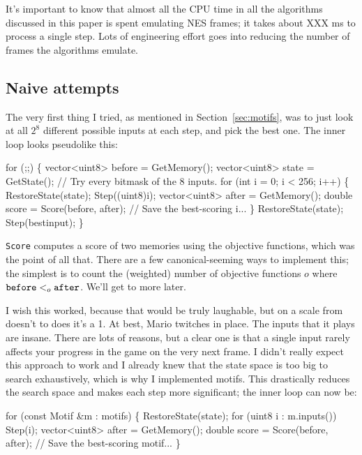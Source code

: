 \documentclass[twocolumn]{article}
\begin{document}
It's important to know that almost all the CPU time in all the
algorithms discussed in this paper is spent emulating NES frames;
it takes about XXX ms to process a single step. Lots of engineering
effort goes into reducing the number of frames the algorithms emulate.

\subsection{Naive attempts}

The very first thing I tried, as mentioned in
Section~\ref{sec:motifs}, was to just look at all $2^8$ different
possible inputs at each step, and pick the best one. The inner
loop looks pseudolike this:

\begin{code}
  for (;;) \{
    vector<uint8> before = GetMemory();
    vector<uint8> state = GetState();
    // Try every bitmask of the 8 inputs.
    for (int i = 0; i < 256; i++) \{
      RestoreState(state);
      Step((uint8)i);
      vector<uint8> after = GetMemory();
      double score = Score(before, after);
      // Save the best-scoring i...
    \}
    RestoreState(state);
    Step(bestinput);
  \}
\end{code}

{\tt Score} computes a score of two memories using the objective
functions, which was the point of all that. There are a few
canonical-seeming ways to implement this; the simplest is to
count the (weighted) number of objective functions $o$ where
${\tt before} <_o {\tt after}$. We'll get to more later.

I wish this worked, because that would be truly laughable, but
on a scale from doesn't to does it's a 1. At best, Mario twitches
in place. The inputs that it plays are insane. There are lots of
reasons, but a clear one is that a single input rarely affects
your progress in the game on the very next frame. I didn't really
expect this approach to work and I already knew that the state
space is too big to search exhaustively, which is why I implemented
motifs. This drastically reduces the search space and makes each
step more significant; the inner loop can now be:

\begin{code}
for (const Motif &m : motifs) \{
  RestoreState(state);
  for (uint8 i : m.inputs()) Step(i);
  vector<uint8> after = GetMemory();
  double score = Score(before, after);
  // Save the best-scoring motif...
\}
\end{code}
\end{document}
